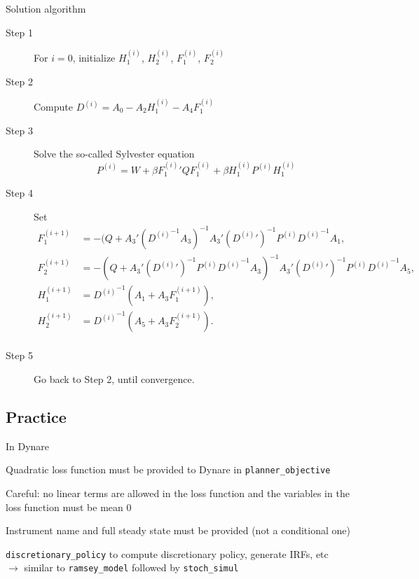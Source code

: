 \documentclass[handout,usepdftitle=false,xcolor=dvipsnames,aspectratio=169]{beamer}
\begin{document}
\begin{frame}{\textcite{Dennis2007} Solution algorithm}
  {\scriptsize
    \begin{description}
      \item[Step 1] For $i=0$, initialize $H_1^{(i)}$, $H_2^{(i)}$, $F_1^{(i)}$,
            $F_2^{(i)}$
      \item[Step 2] Compute $D^{(i)} = A_0 - A_2 H_1^{(i)} - A_4 F_1^{(i)}$
      \item[Step 3] Solve the so-called Sylvester equation
            \begin{equation}
              P^{(i)} = W + \beta {F_1^{(i)}}'Q F_1^{(i)} + \beta H_1^{(i)} P^{(i)} H_1^{(i)}
            \end{equation}
      \item[Step 4] Set
            \begin{align*}
              F_1^{(i+1)} & =  -(Q+A_3'(                                            %
              {D^{(i)}}^{-1}A_3)^{-1}A_3'({D^{(i)}}')^{-1}P^{(i)}{D^{(i)}}^{-1}A_1, \\
              F_2^{(i+1)} & =   -(Q+A_3'({D^{(i)}}')^{-1}P^{(i)}
              {D^{(i)}}^{-1}A_3)^{-1}A_3'({D^{(i)}}')^{-1}P^{(i)}{D^{(i)}}^{-1}A_5, \\
              H^{(i+1)}_1 & = {D^{(i)}}^{-1}(A_1+A_3F_1^{(i+1)}),                   \\
              H^{(i+1)}_2 & = {D^{(i)}}^{-1}(A_5+A_3F_2^{(i+1)}).                   \\
            \end{align*}
      \item[Step 5] Go back to Step 2, until convergence.
    \end{description}
  }
\end{frame}

\subsection{Practice}

\begin{frame}{In Dynare}
  \begin{witemize}
    \item Quadratic loss function must be provided to Dynare in \texttt{planner\_objective}
    \item Careful: no linear terms are allowed in the loss function and the variables in the loss function must be mean 0 
    \item Instrument name and full steady state must be provided (not a conditional one)
    \item \texttt{discretionary\_policy} to compute discretionary policy, generate IRFs, etc\\
    $\rightarrow$ similar to \texttt{ramsey\_model} followed by \texttt{stoch\_simul}
  \end{witemize}
\end{frame}
\end{document}
